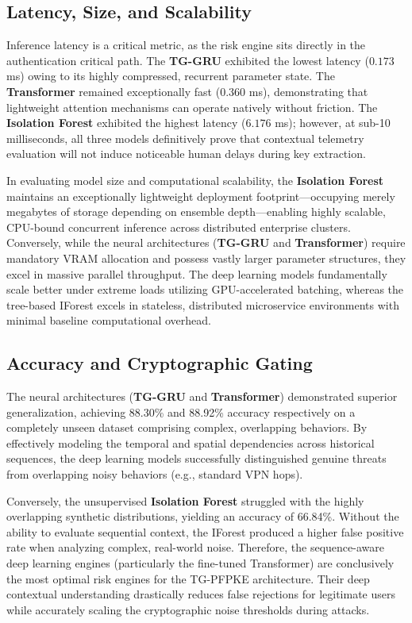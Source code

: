 \documentclass[pdflatex,sn-mathphys-num]{sn-jnl}
\theoremstyle{thmstyleone}%
\theoremstyle{thmstyletwo}%
\theoremstyle{thmstylethree}%
\begin{document}
\subsection{Latency, Size, and Scalability}
Inference latency is a critical metric, as the risk engine sits directly in the authentication critical path. The \textbf{TG-GRU} exhibited the lowest latency ($0.173$ ms) owing to its highly compressed, recurrent parameter state. The \textbf{Transformer} remained exceptionally fast ($0.360$ ms), demonstrating that lightweight attention mechanisms can operate natively without friction. The \textbf{Isolation Forest} exhibited the highest latency ($6.176$ ms); however, at sub-10 milliseconds, all three models definitively prove that contextual telemetry evaluation will not induce noticeable human delays during key extraction. 

In evaluating model size and computational scalability, the \textbf{Isolation Forest} maintains an exceptionally lightweight deployment footprint—occupying merely megabytes of storage depending on ensemble depth—enabling highly scalable, CPU-bound concurrent inference across distributed enterprise clusters. Conversely, while the neural architectures (\textbf{TG-GRU} and \textbf{Transformer}) require mandatory VRAM allocation and possess vastly larger parameter structures, they excel in massive parallel throughput. The deep learning models fundamentally scale better under extreme loads utilizing GPU-accelerated batching, whereas the tree-based IForest excels in stateless, distributed microservice environments with minimal baseline computational overhead.

\subsection{Accuracy and Cryptographic Gating}
The neural architectures (\textbf{TG-GRU} and \textbf{Transformer}) demonstrated superior generalization, achieving 88.30\% and 88.92\% accuracy respectively on a completely unseen dataset comprising complex, overlapping behaviors. By effectively modeling the temporal and spatial dependencies across historical sequences, the deep learning models successfully distinguished genuine threats from overlapping noisy behaviors (e.g., standard VPN hops). 

Conversely, the unsupervised \textbf{Isolation Forest} struggled with the highly overlapping synthetic distributions, yielding an accuracy of 66.84\%. Without the ability to evaluate sequential context, the IForest produced a higher false positive rate when analyzing complex, real-world noise. Therefore, the sequence-aware deep learning engines (particularly the fine-tuned Transformer) are conclusively the most optimal risk engines for the TG-PFPKE architecture. Their deep contextual understanding drastically reduces false rejections for legitimate users while accurately scaling the cryptographic noise thresholds during attacks.
\end{document}
